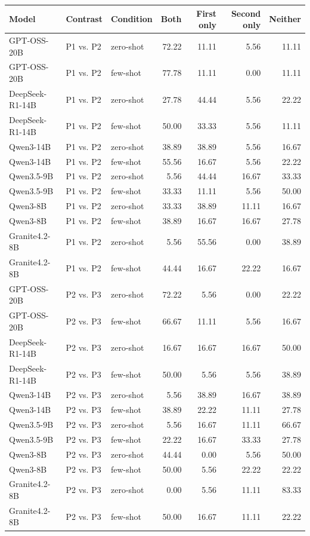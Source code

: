 \begin{tabularx}{\textwidth}{llXrrrr}
\toprule
Model & Contrast & Condition & Both & First only & Second only & Neither \\
\midrule
GPT-OSS-20B & P1 vs. P2 & zero-shot & 72.22 & 11.11 & 5.56 & 11.11 \\
GPT-OSS-20B & P1 vs. P2 & few-shot & 77.78 & 11.11 & 0.00 & 11.11 \\
DeepSeek-R1-14B & P1 vs. P2 & zero-shot & 27.78 & 44.44 & 5.56 & 22.22 \\
DeepSeek-R1-14B & P1 vs. P2 & few-shot & 50.00 & 33.33 & 5.56 & 11.11 \\
Qwen3-14B & P1 vs. P2 & zero-shot & 38.89 & 38.89 & 5.56 & 16.67 \\
Qwen3-14B & P1 vs. P2 & few-shot & 55.56 & 16.67 & 5.56 & 22.22 \\
Qwen3.5-9B & P1 vs. P2 & zero-shot & 5.56 & 44.44 & 16.67 & 33.33 \\
Qwen3.5-9B & P1 vs. P2 & few-shot & 33.33 & 11.11 & 5.56 & 50.00 \\
Qwen3-8B & P1 vs. P2 & zero-shot & 33.33 & 38.89 & 11.11 & 16.67 \\
Qwen3-8B & P1 vs. P2 & few-shot & 38.89 & 16.67 & 16.67 & 27.78 \\
Granite4.2-8B & P1 vs. P2 & zero-shot & 5.56 & 55.56 & 0.00 & 38.89 \\
Granite4.2-8B & P1 vs. P2 & few-shot & 44.44 & 16.67 & 22.22 & 16.67 \\
GPT-OSS-20B & P2 vs. P3 & zero-shot & 72.22 & 5.56 & 0.00 & 22.22 \\
GPT-OSS-20B & P2 vs. P3 & few-shot & 66.67 & 11.11 & 5.56 & 16.67 \\
DeepSeek-R1-14B & P2 vs. P3 & zero-shot & 16.67 & 16.67 & 16.67 & 50.00 \\
DeepSeek-R1-14B & P2 vs. P3 & few-shot & 50.00 & 5.56 & 5.56 & 38.89 \\
Qwen3-14B & P2 vs. P3 & zero-shot & 5.56 & 38.89 & 16.67 & 38.89 \\
Qwen3-14B & P2 vs. P3 & few-shot & 38.89 & 22.22 & 11.11 & 27.78 \\
Qwen3.5-9B & P2 vs. P3 & zero-shot & 5.56 & 16.67 & 11.11 & 66.67 \\
Qwen3.5-9B & P2 vs. P3 & few-shot & 22.22 & 16.67 & 33.33 & 27.78 \\
Qwen3-8B & P2 vs. P3 & zero-shot & 44.44 & 0.00 & 5.56 & 50.00 \\
Qwen3-8B & P2 vs. P3 & few-shot & 50.00 & 5.56 & 22.22 & 22.22 \\
Granite4.2-8B & P2 vs. P3 & zero-shot & 0.00 & 5.56 & 11.11 & 83.33 \\
Granite4.2-8B & P2 vs. P3 & few-shot & 50.00 & 16.67 & 11.11 & 22.22 \\
\bottomrule
\end{tabularx}
